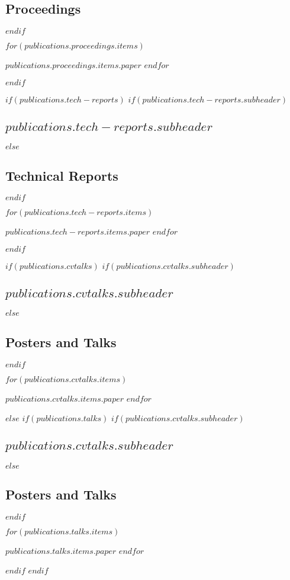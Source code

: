 \documentclass[letterpaper,10pt,final]{moderncv}
\begin{document}
\subsection{Proceedings}
$endif$
\vspace*{0.25em}
\begin{list}{}{\leftmargin=1em \itemindent=-1em \itemsep=0.25em}
$for(publications.proceedings.items)$
\item $publications.proceedings.items.paper$
$endfor$
\end{list}
$endif$

$if(publications.tech-reports)$
$if(publications.tech-reports.subheader)$
\subsection{$publications.tech-reports.subheader$}
$else$
\subsection{Technical Reports}
$endif$
\vspace*{0.25em}
\begin{list}{}{\leftmargin=1em \itemindent=-1em \itemsep=0.25em}
$for(publications.tech-reports.items)$
\item $publications.tech-reports.items.paper$
$endfor$
\end{list}
$endif$

$if(publications.cvtalks)$
$if(publications.cvtalks.subheader)$
\subsection{$publications.cvtalks.subheader$}
$else$
\subsection{Posters and Talks}
$endif$
\vspace*{0.25em}
\begin{list}{}{\leftmargin=1em \itemindent=-1em \itemsep=0.25em}
$for(publications.cvtalks.items)$
\item $publications.cvtalks.items.paper$
$endfor$
\end{list}
$else$
$if(publications.talks)$
$if(publications.cvtalks.subheader)$
\subsection{$publications.cvtalks.subheader$}
$else$
\subsection{Posters and Talks}
$endif$
\vspace*{0.25em}
\begin{list}{}{\leftmargin=1em \itemindent=-1em \itemsep=0.25em}
$for(publications.talks.items)$
\item $publications.talks.items.paper$
$endfor$
\end{list}
$endif$
$endif$
\end{document}
